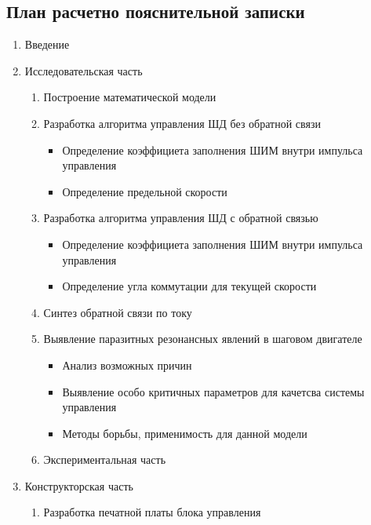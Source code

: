 \newpage
\subsection{План расчетно пояснительной записки}

\begin{enumerate}
    \item Введение
    \item Исследовательская часть
        \begin{enumerate}
            \item Построение математической модели
            \item Разработка алгоритма управления ШД без обратной связи
                \begin{itemize}
                    \item Определение коэффициета заполнения ШИМ внутри импульса управления
                    \item Определение предельной скорости
                \end{itemize}
            \item Разработка алгоритма управления ШД с обратной связью
                \begin{itemize}
                    \item Определение коэффициета заполнения ШИМ внутри импульса управления
                    \item Определение угла коммутации для текущей скорости
                \end{itemize}
            \item Синтез обратной связи по току
            \item Выявление паразитных резонансных явлений в шаговом двигателе
                \begin{itemize}
                    \item Анализ возможных причин
                    \item Выявление особо критичных параметров для качетсва системы управления
                    \item Методы борьбы, применимость для данной модели
                \end{itemize}
            \item Экспериментальная часть
        \end{enumerate}
    \item Конструкторская часть
        \begin{enumerate}
            \item Разработка печатной платы блока управления

\end{enumerate}
\end{enumerate}
